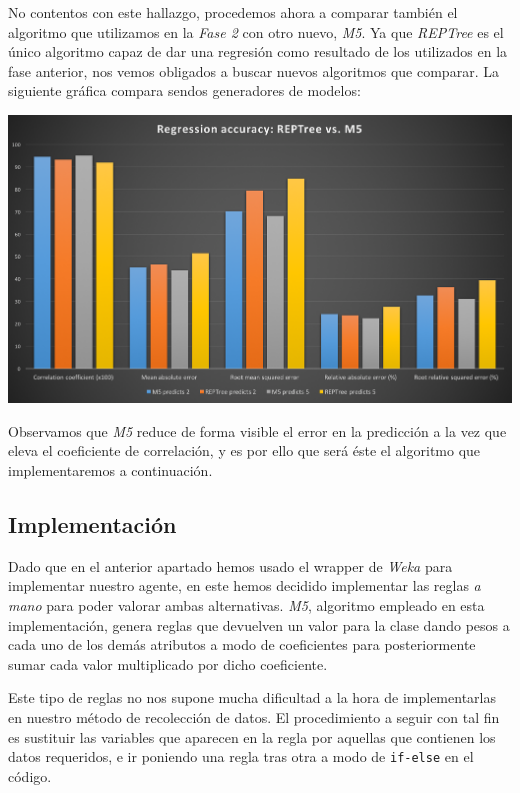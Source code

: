 \documentclass[12pt]{article}
\begin{document}
\newpage

No contentos con este hallazgo, procedemos ahora a comparar también el algoritmo que utilizamos en la \emph{Fase 2} con otro nuevo, \emph{M5}. Ya que \emph{REPTree} es el único algoritmo capaz de dar una regresión como resultado de los utilizados en la fase anterior, nos vemos obligados a buscar nuevos algoritmos que comparar. La siguiente gráfica compara sendos generadores de modelos:

\vspace{0.3cm}

\noindent \includegraphics[width=\textwidth]{REPTree_vs_M5}

\vspace{0.3cm}

Observamos que \emph{M5} reduce de forma visible el error en la predicción a la vez que eleva el coeficiente de correlación, y es por ello que será éste el algoritmo que implementaremos a continuación.

\subsection{Implementación}

Dado que en el anterior apartado hemos usado el wrapper de \emph{Weka} para implementar nuestro agente, en este hemos decidido implementar las reglas \emph{a mano} para poder valorar ambas alternativas. \emph{M5}, algoritmo empleado en esta implementación, genera reglas que devuelven un valor para la clase dando pesos a cada uno de los demás atributos a modo de coeficientes para posteriormente sumar cada valor multiplicado por dicho coeficiente.

Este tipo de reglas no nos supone mucha dificultad a la hora de implementarlas en nuestro método de recolección de datos. El procedimiento a seguir con tal fin es sustituir las variables que aparecen en la regla por aquellas que contienen los datos requeridos, e ir poniendo una regla tras otra a modo de \texttt{if-else} en el código.
\end{document}
